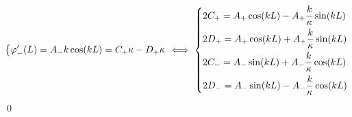 \documentclass[uplatex,dvipdfmx,a4paper,11pt]{jlreq}
\makeatletter
\numberwithin{equation}{section}
\theoremstyle{definition}
\renewenvironment{proof}[1][\proofname]{\par
  \normalfont
  \topsep6\p@\@plus6\p@ \trivlist
  \item[\hskip\labelsep{\bfseries #1}\@addpunct{\bfseries}]\ignorespaces\quad\par
}{%
  \qed\endtrivlist\@endpefalse
}
\renewcommand\proofname{証明}
\makeatother
\begin{document}
\begin{proof}
\begin{align}
\begin{dcases}
      \varphi_-'(L) = A_-k\cos(kL) = C_+\kappa - D_+\kappa  \\
    \end{dcases}
    \iff
    \begin{dcases}
      2C_+ = A_+\cos(kL) - A_+\frac{k}{\kappa}\sin(kL) \\
      2D_+ = A_+\cos(kL) + A_+\frac{k}{\kappa}\sin(kL) \\
      2C_- = A_-\sin(kL) + A_-\frac{k}{\kappa}\cos(kL) \\
      2D_- = A_-\sin(kL) - A_-\frac{k}{\kappa}\cos(kL) \\
    \end{dcases}
  \end{align}
\end{proof}
\end{document}
